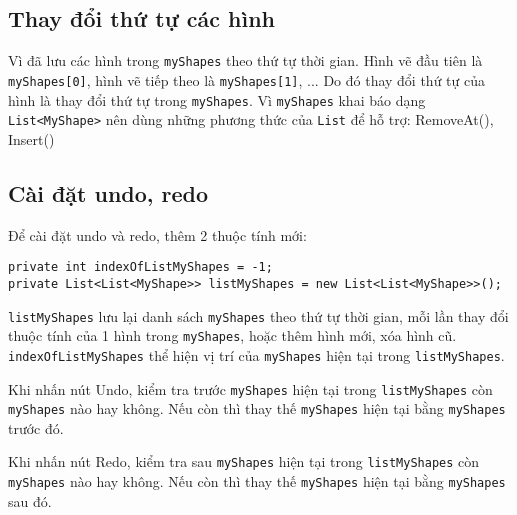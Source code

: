 \documentclass[12pt]{article}
\begin{document}
\subsection{Thay đổi thứ tự các hình}
Vì đã lưu các hình trong \texttt{myShapes} theo thứ tự thời gian.
Hình vẽ đầu tiên là \texttt{myShapes[0]}, hình vẽ tiếp theo là \texttt{myShapes[1]}, ...
Do đó thay đổi thứ tự của hình là thay đổi thứ tự trong \texttt{myShapes}.
Vì \texttt{myShapes} khai báo dạng \texttt{List<MyShape>}
nên dùng những phương thức của \texttt{List} để hỗ trợ: RemoveAt(), Insert()

\subsection{Cài đặt undo, redo}
Để cài đặt undo và redo, thêm 2 thuộc tính mới:
\begin{lstlisting}
private int indexOfListMyShapes = -1;
private List<List<MyShape>> listMyShapes = new List<List<MyShape>>();
\end{lstlisting}

\texttt{listMyShapes} lưu lại danh sách \texttt{myShapes} theo thứ tự thời gian,
mỗi lần thay đổi  thuộc tính của 1 hình trong \texttt{myShapes}, hoặc thêm hình mới, xóa hình cũ.
\texttt{indexOfListMyShapes} thể hiện vị trí của \texttt{myShapes} hiện tại trong \texttt{listMyShapes}.

Khi nhấn nút Undo, kiểm tra trước \texttt{myShapes} hiện tại trong \texttt{listMyShapes}
còn \texttt{myShapes} nào hay không.
Nếu còn thì thay thế \texttt{myShapes} hiện tại bằng \texttt{myShapes} trước đó.

Khi nhấn nút Redo, kiểm tra sau \texttt{myShapes} hiện tại trong \texttt{listMyShapes}
còn \texttt{myShapes} nào hay không.
Nếu còn thì thay thế \texttt{myShapes} hiện tại bằng \texttt{myShapes} sau đó.
\end{document}
